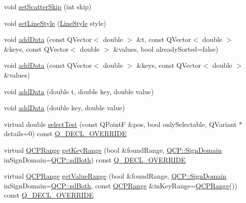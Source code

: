 \begin{DoxyCompactItemize}
\item 
void \hyperlink{class_q_c_p_curve_a97dbfecd497e972d5f2162615e6da5be}{set\+Scatter\+Skip} (int skip)
\item 
void \hyperlink{class_q_c_p_curve_a4a377ec863ff81a1875c3094a6177c19}{set\+Line\+Style} (\hyperlink{class_q_c_p_curve_a2710e9f79302152cff794c6e16cc01f1}{Line\+Style} style)
\item 
void \hyperlink{class_q_c_p_curve_a73edf394b94f3f24f07518e30565a07f}{add\+Data} (const Q\+Vector$<$ double $>$ \&t, const Q\+Vector$<$ double $>$ \&keys, const Q\+Vector$<$ double $>$ \&values, bool already\+Sorted=false)
\item 
void \hyperlink{class_q_c_p_curve_a6424fa06da1786648c83ad13a0d0aa14}{add\+Data} (const Q\+Vector$<$ double $>$ \&keys, const Q\+Vector$<$ double $>$ \&values)
\item 
void \hyperlink{class_q_c_p_curve_a13398b236f6926014e404eeb5b9f415c}{add\+Data} (double t, double key, double value)
\item 
void \hyperlink{class_q_c_p_curve_ada4762e793cd5707b33f35b8a4b0f8fb}{add\+Data} (double key, double value)
\item 
virtual double \hyperlink{class_q_c_p_curve_a0ed9b7e6b4bc72010d6fcd974af46a8b}{select\+Test} (const Q\+PointF \&pos, bool only\+Selectable, Q\+Variant $\ast$details=0) const \hyperlink{qcustomplot_8hh_a42cc5eaeb25b85f8b52d2a4b94c56f55}{Q\+\_\+\+D\+E\+C\+L\+\_\+\+O\+V\+E\+R\+R\+I\+DE}
\item 
virtual \hyperlink{class_q_c_p_range}{Q\+C\+P\+Range} \hyperlink{class_q_c_p_curve_a22d09087f78f254731197cc0b8783299}{get\+Key\+Range} (bool \&found\+Range, \hyperlink{namespace_q_c_p_afd50e7cf431af385614987d8553ff8a9}{Q\+C\+P\+::\+Sign\+Domain} in\+Sign\+Domain=\hyperlink{namespace_q_c_p_afd50e7cf431af385614987d8553ff8a9aa38352ef02d51ddfa4399d9551566e24}{Q\+C\+P\+::sd\+Both}) const \hyperlink{qcustomplot_8hh_a42cc5eaeb25b85f8b52d2a4b94c56f55}{Q\+\_\+\+D\+E\+C\+L\+\_\+\+O\+V\+E\+R\+R\+I\+DE}
\item 
virtual \hyperlink{class_q_c_p_range}{Q\+C\+P\+Range} \hyperlink{class_q_c_p_curve_a8bb8e3b9085f15921dc40483fb025ab2}{get\+Value\+Range} (bool \&found\+Range, \hyperlink{namespace_q_c_p_afd50e7cf431af385614987d8553ff8a9}{Q\+C\+P\+::\+Sign\+Domain} in\+Sign\+Domain=\hyperlink{namespace_q_c_p_afd50e7cf431af385614987d8553ff8a9aa38352ef02d51ddfa4399d9551566e24}{Q\+C\+P\+::sd\+Both}, const \hyperlink{class_q_c_p_range}{Q\+C\+P\+Range} \&in\+Key\+Range=\hyperlink{class_q_c_p_range}{Q\+C\+P\+Range}()) const \hyperlink{qcustomplot_8hh_a42cc5eaeb25b85f8b52d2a4b94c56f55}{Q\+\_\+\+D\+E\+C\+L\+\_\+\+O\+V\+E\+R\+R\+I\+DE}
\end{DoxyCompactItemize}
